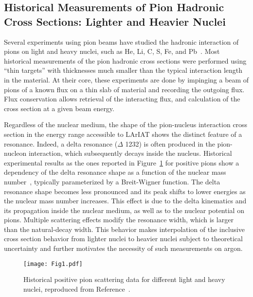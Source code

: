 \documentclass[%
 floatfix,
 reprint,
 twocolumn,
superscriptaddress,
showpacs,preprintnumbers,
 amsmath,amssymb,
 aps,
prd,
]{revtex4-1}
\begin{document}
\subsection{Historical Measurements of Pion Hadronic Cross Sections: Lighter and Heavier Nuclei}
Several experiments using pion beams have studied the hadronic interaction of pions on light and heavy nuclei, such as He, Li, C, S, Fe, and Pb~\cite{Wilkin:1973xd, Clough1974,PhysRevC.14.635,PhysRevC.23.2173}.  Most historical measurements of the pion hadronic cross sections were performed using ``thin targets'' with thicknesses much smaller than the typical interaction length in the material. At their core, these experiments are done by impinging a beam of pions of a known flux on a thin slab of material and recording the outgoing flux. Flux conservation allows retrieval of the interacting flux, and calculation of the cross section at a given beam energy. %

Regardless of the nuclear medium, the shape of the pion-nucleus interaction cross section in the energy range accessible to  LArIAT  shows the distinct feature of a resonance. Indeed, a delta resonance ($\Delta$ 1232) is often produced in the pion-nucleon interaction, which subsequently decays inside the nucleus. Historical experimental results as the ones reported in Figure~\ref{fig:HistoricalData} for positive pions show a dependency of the delta resonance shape as a function of the nuclear mass number~\cite{PhysRevC.14.635}, typically parameterized by a Breit-Wigner function. The delta resonance shape becomes less pronounced and its peak shifts to lower energies as the nuclear mass number increases. This effect is due to the delta kinematics and its  propagation inside the nuclear medium, as well as to the nuclear potential on pions. Multiple scattering effects modify the resonance width, which is larger than the natural-decay width. This behavior makes interpolation of the inclusive cross section behavior from lighter nuclei to heavier nuclei subject to theoretical uncertainty and further motivates the necessity of such measurements on argon.

\begin{figure}
  \centering  
\texttt{[image: Fig1.pdf]}
\caption{ Historical positive pion scattering data for different light and heavy nuclei, reproduced from Reference~\cite{PhysRevC.14.635}.}
\label{fig:HistoricalData}
\end{figure}
\end{document}
